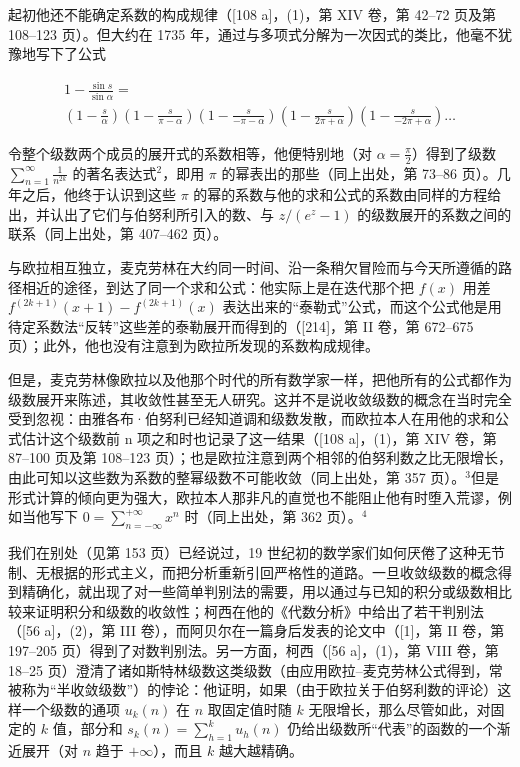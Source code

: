 起初他还不能确定系数的构成规律（{[}108 a{]}，(1)，第 XIV 卷，第 42–72 页及第 108–123 页）。但大约在 1735 年，通过与多项式分解为一次因式的类比，他毫不犹豫地写下了公式

\[
\begin{array}{c} 1 - \frac {\sin s}{\sin \alpha} = \\ \left(1 - \frac {s}{\alpha}\right) \left(1 - \frac {s}{\pi - \alpha}\right) \left(1 - \frac {s}{- \pi - \alpha}\right) \left(1 - \frac {s}{2 \pi + \alpha}\right) \left(1 - \frac {s}{- 2 \pi + \alpha}\right) \dots \end{array}
\]

令整个级数两个成员的展开式的系数相等，他便特别地（对 \(\alpha = \frac{\pi}{2}\)）得到了级数 \(\sum_{n=1}^{\infty} \frac{1}{n^{2k}}\) 的著名表达式\(^2\)，即用 \(\pi\) 的幂表出的那些（同上出处，第 73–86 页）。几年之后，他终于认识到这些 \(\pi\) 的幂的系数与他的求和公式的系数由同样的方程给出，并认出了它们与伯努利所引入的数、与 \(z/(e^z - 1)\) 的级数展开的系数之间的联系（同上出处，第 407–462 页）。

与欧拉相互独立，麦克劳林在大约同一时间、沿一条稍欠冒险而与今天所遵循的路径相近的途径，到达了同一个求和公式：他实际上是在迭代那个把 \(f(x)\) 用差 \(f^{(2k + 1)}(x + 1) - f^{(2k + 1)}(x)\) 表达出来的“泰勒式”公式，而这个公式他是用待定系数法“反转”这些差的泰勒展开而得到的（{[}214{]}，第 II 卷，第 672–675 页）；此外，他也没有注意到为欧拉所发现的系数构成规律。

但是，麦克劳林像欧拉以及他那个时代的所有数学家一样，把他所有的公式都作为级数展开来陈述，其收敛性甚至无人研究。这并不是说收敛级数的概念在当时完全受到忽视：由雅各布·伯努利已经知道调和级数发散，而欧拉本人在用他的求和公式估计这个级数前 n 项之和时也记录了这一结果（{[}108 a{]}，(1)，第 XIV 卷，第 87–100 页及第 108–123 页）；也是欧拉注意到两个相邻的伯努利数之比无限增长，由此可知以这些数为系数的整幂级数不可能收敛（同上出处，第 357 页）。\(^{3}\)但是形式计算的倾向更为强大，欧拉本人那非凡的直觉也不能阻止他有时堕入荒谬，例如当他写下 \(0 = \sum_{n=-\infty}^{+\infty} x^{n}\) 时（同上出处，第 362 页）。\(^{4}\)

我们在别处（见第 153 页）已经说过，19 世纪初的数学家们如何厌倦了这种无节制、无根据的形式主义，而把分析重新引回严格性的道路。一旦收敛级数的概念得到精确化，就出现了对一些简单判别法的需要，用以通过与已知的积分或级数相比较来证明积分和级数的收敛性；柯西在他的《代数分析》中给出了若干判别法（{[}56 a{]}，(2)，第 III 卷），而阿贝尔在一篇身后发表的论文中（{[}1{]}，第 II 卷，第 197–205 页）得到了对数判别法。另一方面，柯西（{[}56 a{]}，(1)，第 VIII 卷，第 18–25 页）澄清了诸如斯特林级数这类级数（由应用欧拉–麦克劳林公式得到，常被称为“半收敛级数”）的悖论：他证明，如果（由于欧拉关于伯努利数的评论）这样一个级数的通项 \(u_k(n)\) 在 \(n\) 取固定值时随 \(k\) 无限增长，那么尽管如此，对固定的 \(k\) 值，部分和 \(s_k(n) = \sum_{h=1}^{k} u_h(n)\) 仍给出级数所“代表”的函数的一个渐近展开（对 \(n\) 趋于 \(+\infty\)），而且 \(k\) 越大越精确。


